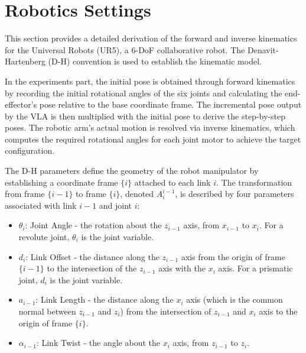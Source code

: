 \documentclass{article}
\begin{document}


\section{Robotics Settings}
This section provides a detailed derivation of the forward and inverse kinematics for the Universal Robots (UR5), a 6-DoF collaborative robot. The Denavit-Hartenberg (D-H) convention is used to establish the kinematic model. 

In the experiments part, the initial pose is obtained through forward kinematics by recording the initial rotational angles of the six joints and calculating the end-effector's pose relative to the base coordinate frame. The incremental pose output by the VLA is then multiplied with the initial pose to derive the step-by-step poses. The robotic arm's actual motion is resolved via inverse kinematics, which computes the required rotational angles for each joint motor to achieve the target configuration.

The D-H parameters define the geometry of the robot manipulator by establishing a coordinate frame $\{i\}$ attached to each link $i$. The transformation from frame $\{i-1\}$ to frame $\{i\}$, denoted $A_i^{i-1}$, is described by four parameters associated with link $i-1$ and joint $i$:
\begin{itemize}
    \item $\theta_i$: Joint Angle - the rotation about the $z_{i-1}$ axis, from $x_{i-1}$ to $x_i$. For a revolute joint, $\theta_i$ is the joint variable.
    \item $d_i$: Link Offset - the distance along the $z_{i-1}$ axis from the origin of frame $\{i-1\}$ to the intersection of the $z_{i-1}$ axis with the $x_i$ axis. For a prismatic joint, $d_i$ is the joint variable.
    \item $a_{i-1}$: Link Length - the distance along the $x_i$ axis (which is the common normal between $z_{i-1}$ and $z_i$) from the intersection of $z_{i-1}$ and $x_i$ axis to the origin of frame $\{i\}$.
    \item $\alpha_{i-1}$: Link Twist - the angle about the $x_i$ axis, from $z_{i-1}$ to $z_i$.
\end{itemize}
\end{document}
